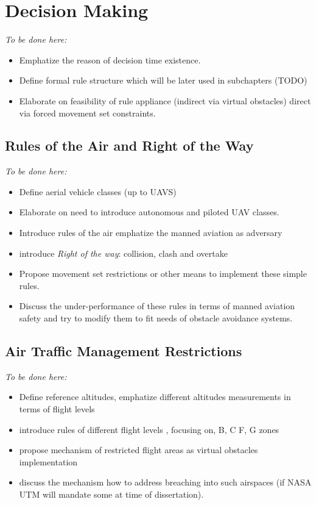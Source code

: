 \section{Decision Making}\label{s:Decision making}
    \emph{To be done here:}
    \begin{itemize}
        \item Emphatize the reason of decision time existence.
        \item Define formal rule structure which will be later used in subchapters (TODO)
        \item Elaborate on feasibility of rule appliance (indirect via virtual obstacles) direct via forced movement set constraints.
    \end{itemize}

\subsection{Rules of the Air and Right of the Way}\label{s:RulesofTheAir}
    \emph{To be done here:}
    \begin{itemize}
        \item Define aerial vehicle classes (up to UAVS)
        \item Elaborate on need to introduce autonomous and piloted UAV classes.
        \item Introduce rules of the air emphatize the manned aviation as adversary
        \item introduce \emph{Right of the way}: collision, clash and overtake
        \item Propose movement set restrictions or other means to implement these simple rules.
        \item Discuss the under-performance of these rules in terms of manned aviation safety and try to modify them to fit needs of obstacle avoidance systems.
    \end{itemize}
    
\subsection{Air Traffic Management Restrictions}\label{s:AirTrafficManagementRestrictions}
    \emph{To be done here:}
    \begin{itemize}
        \item Define reference altitudes, emphatize different altitudes measurements in terms of flight levels
        \item introduce rules of different flight levels , focusing on, B, C F, G zones 
        \item propose mechanism of restricted flight areas as virtual obstacles implementation
        \item discuss the mechanism how to address breaching into such airspaces (if NASA UTM will mandate some at time of dissertation).
    \end{itemize}
    
